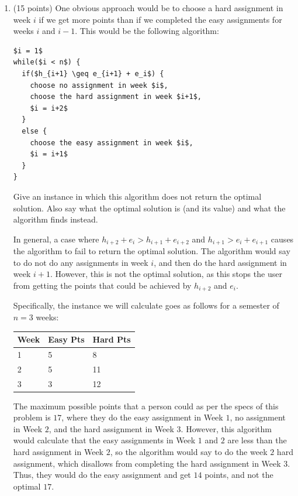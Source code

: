 \documentclass[11pt]{article}
\begin{document}
\begin{enumerate}
\item (15 points) One obvious approach would be to choose a hard assignment in week $i$ if we get more points than if we completed the easy assignments 
for weeks $i$ and $i-1$. This would be the following algorithm:

\begin{lstlisting}[mathescape]
$i = 1$
while($i < n$) {
  if($h_{i+1} \geq e_{i+1} + e_i$) {
    choose no assignment in week $i$,
    choose the hard assignment in week $i+1$,
    $i = i+2$
  }
  else {
    choose the easy assignment in week $i$,
    $i = i+1$
  }
}
\end{lstlisting}

Give an instance in which this algorithm does not return the optimal solution. Also say what the optimal solution is (and its value) and 
what the algorithm finds instead.

In general, a case where $h_{i+2} + e_{i} > h_{i+1} + e_{i+2}$ and $h_{i+1} > e_{i} + e_{i+1}$ causes the algorithm to fail to return the optimal solution. 
The algorithm would say to do not do any assignments in week $i$, and then do the hard assignment in week $i+1$. 
However, this is not the optimal solution, as this stops the user from getting the points that 
could be achieved by $h_{i+2}$ and $e_{i}$. 

Specifically, the instance we will calculate goes as follows for a semester of $n=3$ weeks:

\begin{table}[h]
\centering
\begin{tabular}{|l|l|l|}
\hline
\textbf{Week} & \textbf{Easy Pts} & \textbf{Hard Pts} \\ \hline
1 & 5 & 8 \\ \hline
2 & 5 & 11 \\ \hline
3 & 3 & 12 \\ \hline
\end{tabular}
\end{table}

The maximum possible points that a person could as per the specs of this problem is $17$, where they do the easy assignment in Week $1$, 
no assignment in Week $2$, and the hard assignment in Week $3$. However, this algorithm would calculate that the easy assignments in Week $1$ and $2$ 
are less than the hard assignment in Week $2$, so the algorithm would say to do the week $2$ hard assignment, which disallows from completing 
the hard assignment in Week $3$. Thus, they would do the easy assignment and get $14$ points, and not the optimal $17$.


\end{enumerate}
\end{document}
